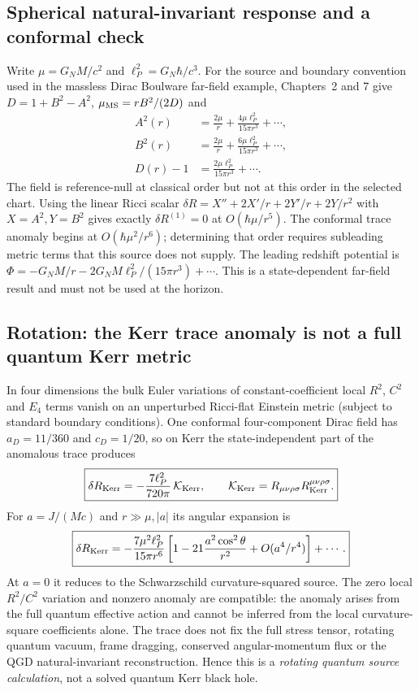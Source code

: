 \documentclass[11pt,a4paper]{article}
\theoremstyle{definition}\newtheorem{definition}[theorem]{Definition}
\theoremstyle{remark}\newtheorem{remark}[theorem]{Remark}
\begin{document}
\subsection{Spherical natural-invariant response and a conformal check}
Write $\mu=G_NM/c^2$ and $\ell_P^2=G_N\hbar/c^3$. For the source and boundary convention used in the massless Dirac Boulware far-field example, Chapters~2 and 7 give $D=1+B^2-A^2$, $\mu_{\rm MS}=rB^2/(2D)$ and
\begin{equation}\label{eq:q053-A-B}
\boxed{\begin{aligned}
 A^2(r)&=\frac{2\mu}{r}+\frac{4\mu\ell_P^2}{15\pi r^3}+\cdots,\\
 B^2(r)&=\frac{2\mu}{r}+\frac{6\mu\ell_P^2}{15\pi r^3}+\cdots,\\
 D(r)-1&=\frac{2\mu\ell_P^2}{15\pi r^3}+\cdots.
\end{aligned}}
\end{equation}
The field is reference-null at classical order but not at this order in the selected chart. Using the linear Ricci scalar $\delta R=X''+2X'/r+2Y'/r+2Y/r^2$ with $X=A^2,Y=B^2$ gives exactly $\delta R^{(1)}=0$ at $O(\hbar\mu/r^5)$. The conformal trace anomaly begins at $O(\hbar\mu^2/r^6)$; determining that order requires subleading metric terms that this source does not supply. The leading redshift potential is $\Phi=-G_NM/r-2G_NM\ell_P^2/(15\pi r^3)+\cdots$. This is a state-dependent far-field result and must not be used at the horizon.

\subsection{Rotation: the Kerr trace anomaly is not a full quantum Kerr metric}
In four dimensions the bulk Euler variations of constant-coefficient local $R^2$, $C^2$ and $E_4$ terms vanish on an unperturbed Ricci-flat Einstein metric (subject to standard boundary conditions). One conformal four-component Dirac field has $a_D=11/360$ and $c_D=1/20$, so on Kerr the state-independent part of the anomalous trace produces
\begin{equation}\label{eq:q053-kerr}
\boxed{\delta R_{\rm Kerr}=-\frac{7\ell_P^2}{720\pi}\,\mathcal K_{\rm Kerr},\qquad \mathcal K_{\rm Kerr}=R_{\mu\nu\rho\sigma}R^{\mu\nu\rho\sigma}_{\rm Kerr}.}
\end{equation}
For $a=J/(Mc)$ and $r\gg\mu,|a|$ its angular expansion is
\begin{equation}
\boxed{\delta R_{\rm Kerr}=-\frac{7\mu^2\ell_P^2}{15\pi r^6}\left[1-21\frac{a^2\cos^2\theta}{r^2}+O(a^4/r^4)\right]+\cdots.}
\end{equation}
At $a=0$ it reduces to the Schwarzschild curvature-squared source. The zero local $R^2/C^2$ variation and nonzero anomaly are compatible: the anomaly arises from the full quantum effective action and cannot be inferred from the local curvature-square coefficients alone. The trace does not fix the full stress tensor, rotating quantum vacuum, frame dragging, conserved angular-momentum flux or the QGD natural-invariant reconstruction. Hence this is a \emph{rotating quantum source calculation}, not a solved quantum Kerr black hole.
\end{document}
